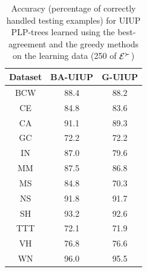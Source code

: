 %
%
%

{
	\begin{table}
	  \centering
	  \begin{tabular}{ |c||c|c| }
	    \hline
	    Dataset          & BA-UIUP & G-UIUP \\
	    \hline \hline                               
	    BCW              & 88.4   & 88.2     \\ \hline
	    CE               & 84.8   & 83.6     \\ \hline
	    CA               & 91.1   & 89.3     \\ \hline
	    GC               & 72.2   & 72.2     \\ \hline
	    IN               & 87.0   & 79.6     \\ \hline
	    MM               & 87.5   & 86.8     \\ \hline
	    MS               & 84.8   & 70.3     \\ \hline
	    NS               & 91.8   & 91.7     \\ \hline
	    SH               & 93.2   & 92.6     \\ \hline
	    TTT              & 72.1   & 71.9     \\ \hline
	    VH               & 76.8   & 76.6     \\ \hline
	    WN               & 96.0   & 95.5     \\ \hline
	  \end{tabular}
	  \caption{Accuracy (percentage of correctly handled testing examples)
						 for UIUP PLP-trees learned using the best-agreement and
						 the greedy methods on the learning 
						 data (250 of $\mathcal{E}^\succ$)}
	  \label{tbl:trees1}
	\end{table}
}


